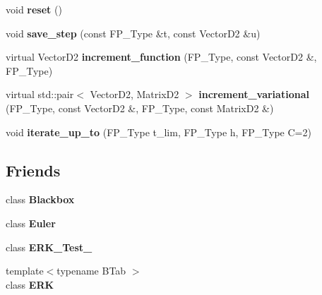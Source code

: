 \begin{DoxyCompactItemize}
\mbox{\label{classOneStepMethod_a4e6743b0343a6c5bb75e423649915b86}} 
void {\bfseries reset} ()
\item 
\mbox{\label{classOneStepMethod_a511d73f8ac7ba27a4e0289b70be7ffad}} 
void {\bfseries save\+\_\+step} (const F\+P\+\_\+\+Type \&t, const Vector\+D2 \&u)
\item 
\mbox{\label{classOneStepMethod_aee957997a620c414ebb999df49debf5b}} 
virtual Vector\+D2 {\bfseries increment\+\_\+function} (F\+P\+\_\+\+Type, const Vector\+D2 \&, F\+P\+\_\+\+Type)
\item 
\mbox{\label{classOneStepMethod_aa599262a475dd7f837600093a00b70d3}} 
virtual std\+::pair$<$ Vector\+D2, Matrix\+D2 $>$ {\bfseries increment\+\_\+variational} (F\+P\+\_\+\+Type, const Vector\+D2 \&, F\+P\+\_\+\+Type, const Matrix\+D2 \&)
\item 
\mbox{\label{classOneStepMethod_adf00efa88d6fb3d1e9f7b3024375a0b4}} 
void {\bfseries iterate\+\_\+up\+\_\+to} (F\+P\+\_\+\+Type t\+\_\+lim, F\+P\+\_\+\+Type h, F\+P\+\_\+\+Type C=2)
\end{DoxyCompactItemize}
\subsection*{Friends}
\begin{DoxyCompactItemize}
\item 
\mbox{\label{classOneStepMethod_af3aa570b8e278b935d7dc84d2774ccb7}} 
class {\bfseries Blackbox}
\item 
\mbox{\label{classOneStepMethod_a9e8c94ebada889fba517c82fc3408d32}} 
class {\bfseries Euler}
\item 
\mbox{\label{classOneStepMethod_a146a867264afb1cda48fa788ceca1f13}} 
class {\bfseries E\+R\+K\+\_\+\+Test\+\_}
\item 
\mbox{\label{classOneStepMethod_a55adbdc4c0fea0e770e4d18b0379d490}} 
{\footnotesize template$<$typename B\+Tab $>$ }\\class {\bfseries E\+RK}
\end{DoxyCompactItemize}


